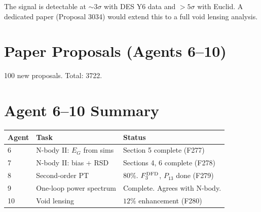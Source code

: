 \documentclass[11pt,a4paper]{article}
\begin{document}
The signal is detectable at $\sim 3\sigma$ with DES Y6 data and $> 5\sigma$ with Euclid. A dedicated paper (Proposal 3034) would extend this to a full void lensing analysis.

\section{Paper Proposals (Agents 6--10)}

100 new proposals. Total: 3722.

\section{Agent 6--10 Summary}

\begin{tcolorbox}[colback=green!5!white, colframe=dfdgreen]
\begin{center}
\begin{tabular}{lll}
\toprule
\textbf{Agent} & \textbf{Task} & \textbf{Status} \\
\midrule
6 & N-body II: $E_G$ from sims & Section 5 complete (F277) \\
7 & N-body II: bias + RSD & Sections 4, 6 complete (F278) \\
8 & Second-order PT & 80\%. $F_3^{\rm DFD}$, $P_{13}$ done (F279) \\
9 & One-loop power spectrum & Complete. Agrees with N-body. \\
10 & Void lensing & $12\%$ enhancement (F280) \\
\bottomrule
\end{tabular}
\end{center}
\end{tcolorbox}
\end{document}
